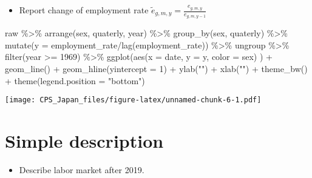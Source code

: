 \documentclass[
]{book}
\newenvironment{Shaded}{\begin{snugshade}}{\end{snugshade}}
\newcommand{\AttributeTok}[1]{\textcolor[rgb]{0.77,0.63,0.00}{#1}}
\newcommand{\DecValTok}[1]{\textcolor[rgb]{0.00,0.00,0.81}{#1}}
\newcommand{\FunctionTok}[1]{\textcolor[rgb]{0.00,0.00,0.00}{#1}}
\newcommand{\NormalTok}[1]{#1}
\newcommand{\SpecialCharTok}[1]{\textcolor[rgb]{0.00,0.00,0.00}{#1}}
\newcommand{\StringTok}[1]{\textcolor[rgb]{0.31,0.60,0.02}{#1}}
\providecommand{\tightlist}{%
  \setlength{\itemsep}{0pt}\setlength{\parskip}{0pt}}
\begin{document}
\begin{itemize}
\tightlist
\item
  Report change of employment rate \(\tilde e_{g,m,y}=\frac{e_{g,m,y}}{e_{g,m,y-1}}\)
\end{itemize}

\begin{Shaded}
\begin{Highlighting}[]
\NormalTok{raw }\SpecialCharTok{\%\textgreater{}\%}
  \FunctionTok{arrange}\NormalTok{(sex,}
\NormalTok{          quaterly,}
\NormalTok{          year) }\SpecialCharTok{\%\textgreater{}\%}
  \FunctionTok{group\_by}\NormalTok{(sex,}
\NormalTok{           quaterly) }\SpecialCharTok{\%\textgreater{}\%}
  \FunctionTok{mutate}\NormalTok{(}\AttributeTok{y =}\NormalTok{ employment\_rate}\SpecialCharTok{/}\FunctionTok{lag}\NormalTok{(employment\_rate)) }\SpecialCharTok{\%\textgreater{}\%}
\NormalTok{  ungroup }\SpecialCharTok{\%\textgreater{}\%}
  \FunctionTok{filter}\NormalTok{(year }\SpecialCharTok{\textgreater{}=} \DecValTok{1969}\NormalTok{) }\SpecialCharTok{\%\textgreater{}\%}
  \FunctionTok{ggplot}\NormalTok{(}\FunctionTok{aes}\NormalTok{(}\AttributeTok{x =}\NormalTok{ date,}
             \AttributeTok{y =}\NormalTok{ y,}
             \AttributeTok{color =}\NormalTok{ sex)}
\NormalTok{         ) }\SpecialCharTok{+}
  \FunctionTok{geom\_line}\NormalTok{() }\SpecialCharTok{+}
  \FunctionTok{geom\_hline}\NormalTok{(}\AttributeTok{yintercept =} \DecValTok{1}\NormalTok{) }\SpecialCharTok{+}
  \FunctionTok{ylab}\NormalTok{(}\StringTok{""}\NormalTok{) }\SpecialCharTok{+}
  \FunctionTok{xlab}\NormalTok{(}\StringTok{""}\NormalTok{) }\SpecialCharTok{+}
  \FunctionTok{theme\_bw}\NormalTok{() }\SpecialCharTok{+}
  \FunctionTok{theme}\NormalTok{(}\AttributeTok{legend.position =} \StringTok{"bottom"}\NormalTok{)}
\end{Highlighting}
\end{Shaded}

\texttt{[image: CPS\_Japan\_files/figure-latex/unnamed-chunk-6-1.pdf]}

\hypertarget{simple-description}{%
\chapter{Simple description}\label{simple-description}}

\begin{itemize}
\tightlist
\item
  Describe labor market after 2019.
\end{itemize}
\end{document}
